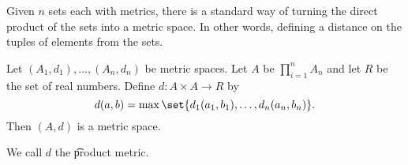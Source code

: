 

Given $n$ sets each with metrics, there is a standard way of turning the direct product of the sets into a metric space.  In other words, defining a distance on the tuples of elements from the sets.


\begin{prop}
  Let $(A_1, d_1), \dots, (A_n, d_n)$
  be metric spaces.
  Let $A$ be $\prod_{i = 1}^n A_n$
  and let $R$ be the set of real numbers.
  Define $d: A \times A \to R$ by
  \[
    d(a, b) = \max\set{d_1(a_1, b_1), \dots, d_n(a_n, b_n)}.
  \]
  Then $(A, d)$ is a metric space.
\end{prop}

We call $d$ the \t{product metric}.

\blankpage

